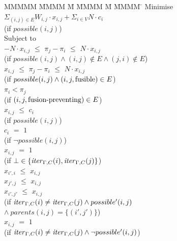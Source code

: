 \begin{tabbing}
MMMMM   \= MMMM \= M \= MMMM \= M \= MMMM \= \kill
Minimise   \> $\Sigma_{(i,j) \in E} W_{i,j} \cdot x_{i,j} + \Sigma_{i \in V} N \cdot c_i$  \\
           \> (if $possible(i,j)$)         \\
Subject to \\
           \> $-N \cdot x_{i,j}$ \> $\le$ \> $\pi_j - \pi_i$ \> $\le$ \> $N \cdot x_{i,j}$ \\
           \> (if $possible(i,j) \wedge (i,j) \not\in E \wedge (j,i) \not\in E$)            
\\[1ex]
           \>    $x_{i,j}$ \> $\le$ \> $\pi_j - \pi_i$ \> $\le$ \> $N \cdot x_{i,j}$ \\
           \> (if $possible(i,j) \wedge (i,j,\mathrm{fusible}) \in E$)     
\\[1ex]
           \>             \>       \> $\pi_i < \pi_j$ \>       \>            \\
           \> (if $(i,j,\mbox{fusion-preventing}) \in E$)    
\\[1ex]
           \> $x_{i,j}$    \> $\le$ \> $c_i$           \>       \>            \\
           \> (if $possible(i,j)$) \\
           \> $c_{i }$    \> $ = $ \> $ 1 $           \>       \>            \\
           \> (if $\neg possible(i,j)$) 
\\[1ex]
           \> $x_{i,j}$    \> $=$   \> $1$             \>       \>            \\
           \> (if $\bot \in \{\mathit{iter}_{\Gamma,C}(i), \mathit{iter}_{\Gamma,C}(j)\}$)  
\\[1ex]
           \> $x_{i',i}$   \> $\le$ \> $x_{i,j}$        \>       \>            \\
           \> $x_{j',j}$   \> $\le$ \> $x_{i,j}$        \>       \>            \\
           \> $x_{i',j'}$   \> $\le$ \> $x_{i,j}$        \>       \>            \\
           \> (if $\mathit{iter}_{\Gamma,C}(i) \not= \mathit{iter}_{\Gamma,C}(j) \wedge possible'(i,j)$ \\
           \> \> $\wedge~parents(i,j) = \{(i',j')\}$) 
\\[1ex]
           \> $x_{i,j}$    \> $=$   \> $1$             \>       \>            \\
           \> (if $\mathit{iter}_{\Gamma,C}(i) \not= \mathit{iter}_{\Gamma,C}(j) \wedge \neg possible'(i,j)$) \\

\end{tabbing}
